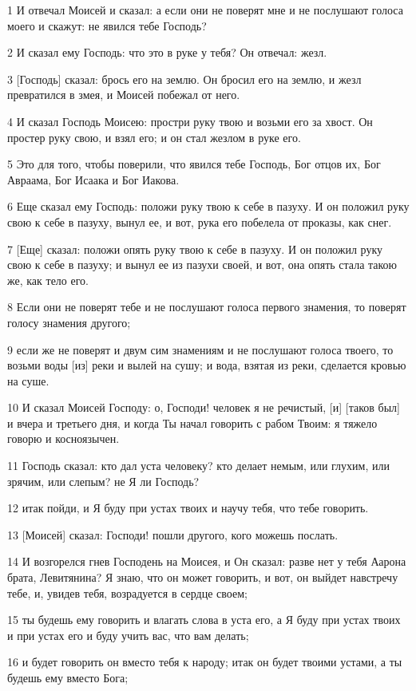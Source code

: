 \par 1 И отвечал Моисей и сказал: а если они не поверят мне и не послушают голоса моего и скажут: не явился тебе Господь?
\par 2 И сказал ему Господь: что это в руке у тебя? Он отвечал: жезл.
\par 3 [Господь] сказал: брось его на землю. Он бросил его на землю, и жезл превратился в змея, и Моисей побежал от него.
\par 4 И сказал Господь Моисею: простри руку твою и возьми его за хвост. Он простер руку свою, и взял его; и он стал жезлом в руке его.
\par 5 Это для того, чтобы поверили, что явился тебе Господь, Бог отцов их, Бог Авраама, Бог Исаака и Бог Иакова.
\par 6 Еще сказал ему Господь: положи руку твою к себе в пазуху. И он положил руку свою к себе в пазуху, вынул ее, и вот, рука его побелела от проказы, как снег.
\par 7 [Еще] сказал: положи опять руку твою к себе в пазуху. И он положил руку свою к себе в пазуху; и вынул ее из пазухи своей, и вот, она опять стала такою же, как тело его.
\par 8 Если они не поверят тебе и не послушают голоса первого знамения, то поверят голосу знамения другого;
\par 9 если же не поверят и двум сим знамениям и не послушают голоса твоего, то возьми воды [из] реки и вылей на сушу; и вода, взятая из реки, сделается кровью на суше.
\par 10 И сказал Моисей Господу: о, Господи! человек я не речистый, [и] [таков был] и вчера и третьего дня, и когда Ты начал говорить с рабом Твоим: я тяжело говорю и косноязычен.
\par 11 Господь сказал: кто дал уста человеку? кто делает немым, или глухим, или зрячим, или слепым? не Я ли Господь?
\par 12 итак пойди, и Я буду при устах твоих и научу тебя, что тебе говорить.
\par 13 [Моисей] сказал: Господи! пошли другого, кого можешь послать.
\par 14 И возгорелся гнев Господень на Моисея, и Он сказал: разве нет у тебя Аарона брата, Левитянина? Я знаю, что он может говорить, и вот, он выйдет навстречу тебе, и, увидев тебя, возрадуется в сердце своем;
\par 15 ты будешь ему говорить и влагать слова в уста его, а Я буду при устах твоих и при устах его и буду учить вас, что вам делать;
\par 16 и будет говорить он вместо тебя к народу; итак он будет твоими устами, а ты будешь ему вместо Бога;
